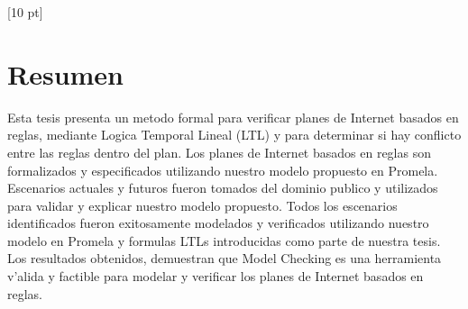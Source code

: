 \titleformat{\chapter}{\Huge\bfseries}{\thechapter}{0 pt}{\rule{340 pt}{3 pt}\\}
\titlespacing{\chapter}{100 pt}{-25 pt}{40 pt}[10 pt]	
\pagestyle{fancy}
\fancyhead[RO,RE]{\thepage}
\fancyfoot[CO,CE]{}

\chapter*{Resumen}


\normalsize
\noindent
Esta tesis presenta un metodo formal para verificar planes de Internet basados en reglas, mediante Logica Temporal Lineal (LTL) y para determinar si hay conflicto entre las reglas dentro del plan. Los planes de Internet basados en reglas son formalizados y especificados utilizando nuestro modelo propuesto en Promela. \\

Escenarios actuales y futuros fueron tomados del dominio publico y utilizados para validar y explicar nuestro modelo propuesto. Todos los escenarios identificados fueron exitosamente modelados y verificados utilizando nuestro modelo en Promela y formulas LTLs introducidas como parte de nuestra tesis. \\

Los resultados obtenidos, demuestran que Model Checking es una herramienta v'alida y factible para modelar y verificar los planes de Internet basados en reglas.
\\


\clearpage